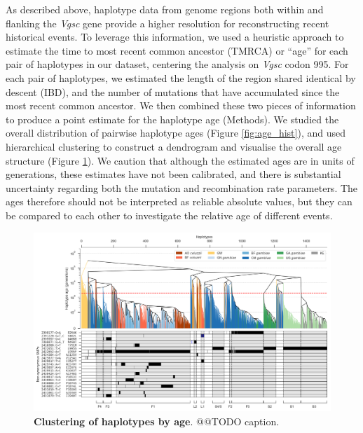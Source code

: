 \documentclass[a4paper,11pt,abstracton,hidelinks]{scrartcl}
\begin{document}
%
As described above, haplotype data from genome regions both within and flanking the \textit{Vgsc} gene provide a higher resolution for reconstructing recent historical events.
%
To leverage this information, we used a heuristic approach to estimate the time to most recent common ancestor (TMRCA) or ``age'' for each pair of haplotypes in our dataset, centering the analysis on \textit{Vgsc} codon 995.
%
For each pair of haplotypes, we estimated the length of the region shared identical by descent (IBD), and the number of mutations that have accumulated since the most recent common ancestor.
%
We then combined these two pieces of information to produce a point estimate for the haplotype age (Methods).
%
We studied the overall distribution of pairwise haplotype ages (Figure \ref{fig:age_hist}), and used hierarchical clustering to construct a dendrogram and visualise the overall age structure (Figure \ref{fig:tree}).
%
We caution that although the estimated ages are in units of generations, these estimates have not been calibrated, and there is substantial uncertainty regarding both the mutation and recombination rate parameters.
%
The ages therefore should not be interpreted as reliable absolute values, but they can be compared to each other to investigate the relative age of different events.

 
%
\begin{figure}[!b]
  \includegraphics[width=1.1\linewidth,center]{artwork/fig_hap_tree.png}
  \caption{\textbf{Clustering of haplotypes by age}. @@TODO caption.}
  \label{fig:tree}
\end{figure}
\end{document}
